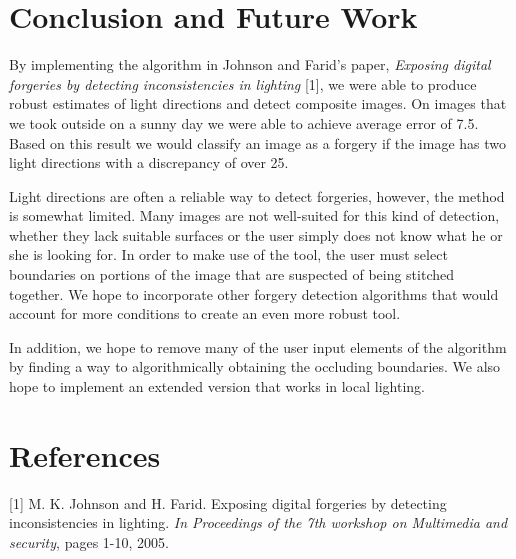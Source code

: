 \documentclass[10pt,twocolumn,letterpaper]{article}
\begin{document}
\section{Conclusion and Future Work}
By implementing the algorithm in Johnson and Farid's paper, \emph{Exposing digital forgeries by detecting inconsistencies in lighting} [1], we were able to produce robust estimates of light directions and detect composite images. On images that we took outside on a sunny day we were able to achieve average error of 7.5\textdegree. Based on this result we would classify an image as a forgery if the image has two light directions with a discrepancy of over 25\textdegree. 
 
Light directions are often a reliable way to detect forgeries, however, the method is somewhat limited. Many images are not well-suited for this kind of detection, whether they lack suitable surfaces or the user simply does not know what he or she is looking for. In order to make use of the tool, the user must select boundaries on portions of the image that are suspected of being stitched together. We hope to incorporate other forgery detection algorithms that would account for more conditions to create an even more robust tool.

In addition, we hope to remove many of the user input elements of the algorithm by finding a way to algorithmically obtaining the occluding boundaries. We also hope to implement an extended version that works in local lighting.
\section{References}

[1] M. K. Johnson and H. Farid. Exposing digital forgeries by detecting inconsistencies in lighting. \emph{In Proceedings of the 7th workshop on Multimedia and security}, pages 1-10, 2005.
\end{document}
